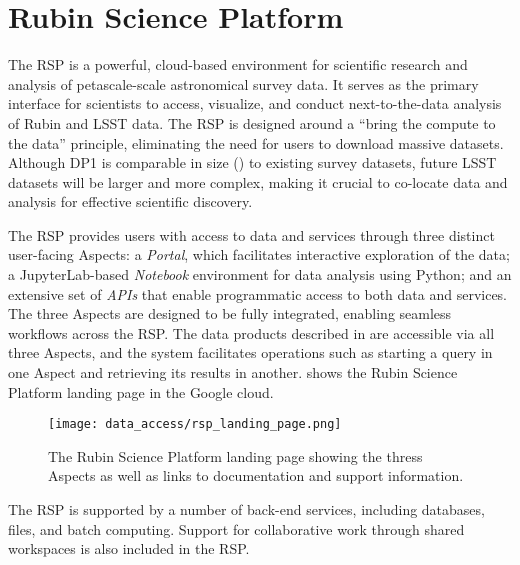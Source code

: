 \section{Rubin Science Platform}
\label{sec:data_services}

The \gls{RSP} \citep{LSE-319} is a powerful, cloud-based environment for scientific research and analysis of petascale-scale astronomical survey data.
It serves as the primary interface for scientists to access, visualize, and conduct next-to-the-data analysis of Rubin and \gls{LSST} data.
The  \gls{RSP} is designed around a  ``bring the compute to the data'' principle, eliminating the need for users to download massive datasets.
Although \gls{DP1} is comparable in size (\sizeinbytes) to existing survey datasets, future \gls{LSST} datasets will be larger and more complex, making it crucial to co-locate data and analysis for effective scientific discovery.

The \gls{RSP} provides users with access to data and services through three distinct user-facing Aspects: a \emph{Portal}, which facilitates interactive exploration of the data; a JupyterLab-based \emph{Notebook} environment for data analysis using Python; and an extensive set of \emph{\glspl{API}} that enable programmatic access to both data and services.
The three Aspects are designed to be fully integrated, enabling seamless workflows across the \gls{RSP}.
The data products described in  are accessible via all three Aspects, and the system facilitates operations such as starting a query in one Aspect and retrieving its results in another.
 shows the Rubin \gls{Science Platform} landing page in the Google cloud.
\begin{figure}[htb!]
\centering
\texttt{[image: data\_access/rsp\_landing\_page.png]}
\caption{The Rubin \gls{Science Platform} landing page showing the thress Aspects as well as links to documentation and support information.}
\label{fig:rsp_landing_page}
\vspace{0.1cm}
\end{figure}

The \gls{RSP} is supported by a number of back-end services, including databases, files, and batch computing.
Support for collaborative work through shared workspaces is also included in the \gls{RSP}.

